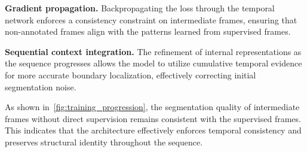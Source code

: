 \noindent
\textbf{Gradient propagation.} Backpropagating the loss through the temporal network enforces a consistency constraint on intermediate frames, ensuring that non-annotated frames align with the patterns learned from supervised frames.

\noindent
\textbf{Sequential context integration.} The refinement of internal representations as the sequence progresses allows the model to utilize cumulative temporal evidence for more accurate boundary localization, effectively correcting initial segmentation noise.

As shown in~\cref{fig:training_progression}, the segmentation quality of intermediate frames without direct supervision remains consistent with the supervised frames.
This indicates that the architecture effectively enforces temporal consistency and preserves structural identity throughout the sequence.